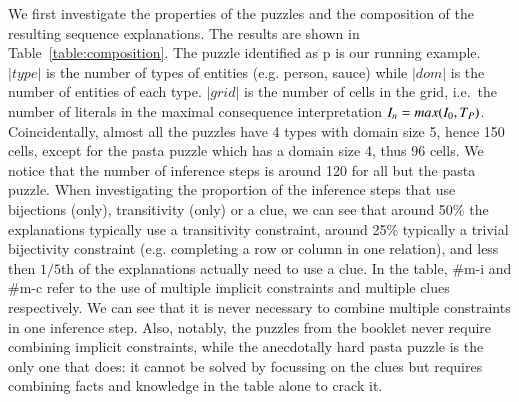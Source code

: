 We first investigate the properties of the puzzles and the composition of the resulting sequence explanations. The results are shown in Table~\ref{table:composition}. 
The puzzle identified as p is our running example. 
$|type|$ is the number of types of entities (e.g. person, sauce) while $|dom|$ is the number of entities of each type. 
$|grid|$ is the number of cells in the grid, i.e.\ the number of literals in the maximal consequence interpretation $I_n=max(I_0,T_P)$.
Coincidentally, almost all the puzzles have 4 types with domain size 5,  hence 150 cells, except for the pasta puzzle which has a domain size 4, thus 96 cells. 
We notice that the number of inference steps is around 120 for all but the pasta puzzle. 
When investigating the proportion of the inference steps that use bijections (only), transitivity (only) or a clue, we can see that around 50\% the explanations typically use a transitivity constraint, around 25\% typically a trivial bijectivity constraint (e.g. completing a row or column in one relation), and less then $1/5$th of the explanations actually need to use a clue.
In the table, \#m-i and \#m-c refer to the use of multiple implicit constraints and multiple clues respectively. 
We can see that it is never necessary to combine multiple constraints in one inference step. 
Also, notably, the puzzles from the booklet never require combining implicit constraints, while the anecdotally hard pasta puzzle is the only one that does: it cannot be solved by focussing on the clues but requires combining facts and knowledge in the table alone to crack it.

